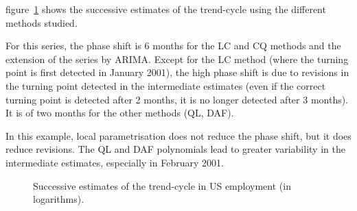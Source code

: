 \documentclass[
]{article}
\newcommand\1{\mathds{1}}
\begin{document}
figure~\ref{fig-ce16ovlp} shows the successive estimates of the
trend-cycle using the different methods studied.

For this series, the phase shift is 6 months for the LC and CQ methods
and the extension of the series by ARIMA. Except for the LC method
(where the turning point is first detected in January 2001), the high
phase shift is due to revisions in the turning point detected in the
intermediate estimates (even if the correct turning point is detected
after 2 months, it is no longer detected after 3 months). It is of two
months for the other methods (QL, DAF).

In this example, local parametrisation does not reduce the phase shift,
but it does reduce revisions. The QL and DAF polynomials lead to greater
variability in the intermediate estimates, especially in February 2001.

\begin{figure}[H]

\caption{\label{fig-ce16ovlp}Successive estimates of the trend-cycle in
US employment (in logarithms).}


\end{figure}%
\end{document}

